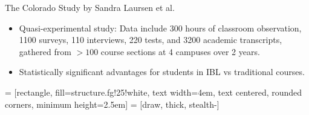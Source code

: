 \documentclass[10pt,handout]{beamer}
\begin{document}

\begin{frame}

\begin{block}{The Colorado Study by Sandra Laursen et al.}
\begin{itemize}
\item Quasi-experimental study: Data include 300 hours of classroom observation, 1100 surveys, 110 interviews, 220 tests, and 3200 academic transcripts, gathered from $>100$ course sections at 4 campuses over 2 years.
\item Statistically significant advantages for students in IBL vs traditional courses.
\end{itemize}
\end{block}

\vspace{-1em}

\begin{center}
 = [rectangle, fill=structure.fg!25!white, text width=4em, text centered, rounded corners, minimum height=2.5em]
 = [draw, thick, stealth-]
\end{center}


\end{frame}

\end{document}
